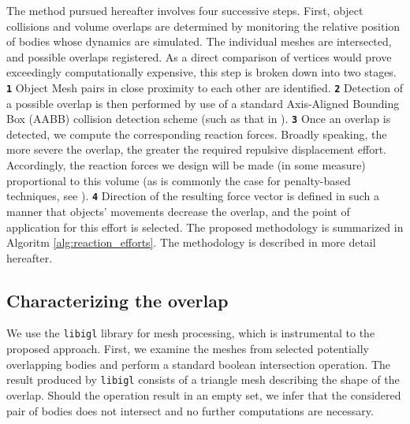 The method pursued hereafter involves four successive steps. First, object collisions and volume overlaps are determined by monitoring the relative position of bodies whose dynamics are simulated. The individual meshes are intersected, and possible overlaps registered. As a direct comparison of vertices would prove exceedingly computationally expensive, this step is broken down into two stages. \texttt{\textbf 1} Object Mesh pairs in close proximity to each other are identified. \texttt{\textbf 2} Detection of a possible overlap is then performed by use of a standard Axis-Aligned Bounding Box (AABB) collision detection scheme (such as that in \cite{jimenez20013d}). \texttt{\textbf 3} Once an overlap is detected, we compute the corresponding reaction forces. Broadly speaking, the more severe the overlap, the greater the required repulsive displacement effort. Accordingly, the reaction forces we design will be made (in some measure) proportional to this volume (as is commonly the case for penalty-based techniques, see \cite{sagardia_penalty}). \texttt{\textbf 4} Direction of the resulting force vector is defined in such a manner that objects' movements decrease the overlap, and the point of application for this effort is selected. The proposed methodology is summarized in Algoritm \ref{alg:reaction_efforts}. The methodology is described in more detail hereafter.


\subsection{Characterizing the overlap}
%
We use the \texttt{libigl} library \cite{jacobson2016libigl} for mesh processing, which is instrumental to the proposed approach. First, we examine the meshes from selected potentially overlapping bodies and perform a standard boolean intersection operation. The result produced by \texttt{libigl} consists of a triangle mesh describing the shape of the overlap. Should the operation result in an empty set, we infer that the considered pair of bodies does not intersect and no further computations are necessary.


